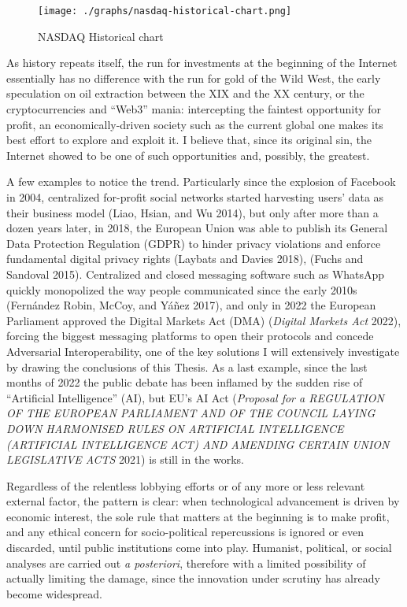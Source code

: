 \documentclass[
  a4paper,
]{book}
\begin{document}
\begin{figure}
\centering
\texttt{[image: ./graphs/nasdaq-historical-chart.png]}
\caption{NASDAQ Historical chart}
\end{figure}

As history repeats itself, the run for investments at the beginning of the Internet essentially has no difference with the run for gold of the Wild West, the early speculation on oil extraction between the XIX and the XX century, or the cryptocurrencies and ``Web3'' mania: intercepting the faintest opportunity for profit, an economically-driven society such as the current global one makes its best effort to explore and exploit it. I believe that, since its original sin, the Internet showed to be one of such opportunities and, possibly, the greatest.

A few examples to notice the trend. Particularly since the explosion of Facebook in 2004, centralized for-profit social networks started harvesting users' data as their business model {(Liao, Hsian, and Wu 2014)}, but only after more than a dozen years later, in 2018, the European Union was able to publish its General Data Protection Regulation (GDPR) to hinder privacy violations and enforce fundamental digital privacy rights {(Laybats and Davies 2018)}, {(Fuchs and Sandoval 2015)}. Centralized and closed messaging software such as WhatsApp quickly monopolized the way people communicated since the early 2010s {(Fernández Robin, McCoy, and Yáñez 2017)}, and only in 2022 the European Parliament approved the Digital Markets Act (DMA) {(\emph{Digital {Markets Act}} 2022)}, forcing the biggest messaging platforms to open their protocols and concede Adversarial Interoperability, one of the key solutions I will extensively investigate by drawing the conclusions of this Thesis. As a last example, since the last months of 2022 the public debate has been inflamed by the sudden rise of ``Artificial Intelligence'' (AI), but EU's AI Act {(\emph{Proposal for a {REGULATION OF THE EUROPEAN PARLIAMENT AND OF THE COUNCIL LAYING DOWN HARMONISED RULES ON ARTIFICIAL INTELLIGENCE} ({ARTIFICIAL INTELLIGENCE ACT}) {AND AMENDING CERTAIN UNION LEGISLATIVE ACTS}} 2021)} is still in the works.

Regardless of the relentless lobbying efforts or of any more or less relevant external factor, the pattern is clear: when technological advancement is driven by economic interest, the sole rule that matters at the beginning is to make profit, and any ethical concern for socio-political repercussions is ignored or even discarded, until public institutions come into play. Humanist, political, or social analyses are carried out \emph{a posteriori}, therefore with a limited possibility of actually limiting the damage, since the innovation under scrutiny has already become widespread.
\end{document}
